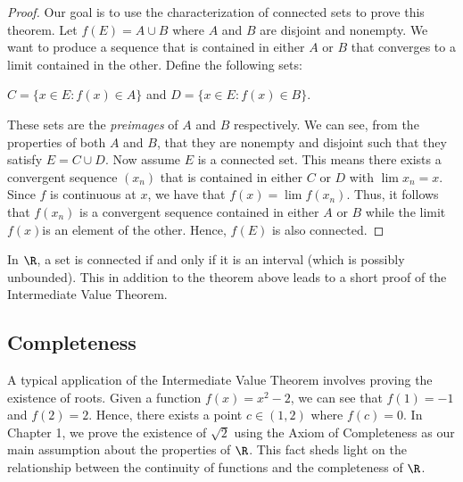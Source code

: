\begin{proof}
Our goal is to use the characterization of connected sets to prove this theorem. Let \( f(E) = A \cup B  \) where \( A  \) and \( B  \) are disjoint and nonempty. We want to produce a sequence that is contained in either \( A  \) or \( B  \) that converges to a limit contained in the other. Define the following sets:
\begin{center}
    \( C = \{ x \in E: f(x) \in A  \}  \) and \( D = \{ x \in E : f(x) \in B  \}  \).
\end{center}
These sets are the \textit{preimages} of \( A  \) and \( B  \) respectively. We can see, from the properties of both \( A  \) and \( B  \), that they are nonempty and disjoint such that they satisfy \( E = C \cup D  \). Now assume \( E  \) is a connected set. This means there exists a convergent sequence \( (x_n)  \) that is contained in either \( C  \) or \( D  \) with \( \lim x_n = x  \). Since \( f \) is continuous at \( x  \), we have that \( f(x) = \lim f(x_n) \). Thus, it follows that \( f(x_n) \) is a convergent sequence contained in either \( A  \) or \( B  \) while the limit \( f(x)  \)is an element of the other. Hence, \( f(E ) \) is also connected.
\end{proof}

In \( \R  \), a set is connected if and only if it is an interval (which is possibly unbounded). This in addition to the theorem above leads to a short proof of the Intermediate Value Theorem. 

\subsection{Completeness}

A typical application of the Intermediate Value Theorem involves proving the existence of roots. Given a function \( f(x) = x^2 - 2  \), we can see that \( f(1) = -1  \) and \( f(2) = 2  \). Hence, there exists a point \( c \in (1,2) \) where \( f(c) = 0  \). In Chapter 1, we prove the existence of \( \sqrt{ 2 }  \) using the Axiom of Completeness as our main assumption about the properties of \( \R  \). This fact sheds light on the relationship between the continuity of functions and the completeness of \( \R  \).


